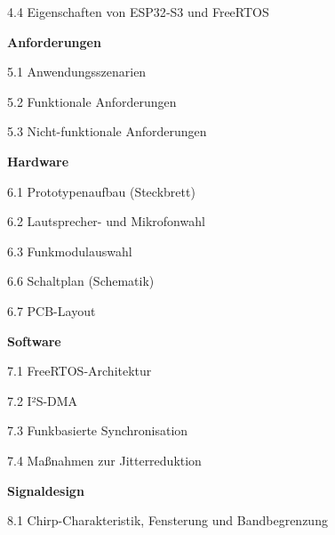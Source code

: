 \documentclass[a4paper,12pt,headsepline]{scrartcl}
\begin{document}
\noindent
\hspace{1cm} 4.4 Eigenschaften von ESP32‑S3 und FreeRTOS 

\vspace{0.5cm}
\noindent
\textbf{Anforderungen} 

\noindent
\hspace{1cm} 5.1 Anwendungsszenarien 

\noindent
\hspace{1cm} 5.2 Funktionale Anforderungen  

\noindent
\hspace{1cm} 5.3 Nicht-funktionale Anforderungen  

\vspace{0.5cm}
\noindent
\textbf{Hardware} 

\noindent
\hspace{1cm} 6.1 Prototypenaufbau (Steckbrett) 

\noindent
\hspace{1cm} 6.2 Lautsprecher- und Mikrofonwahl 

\noindent
\hspace{1cm} 6.3 Funkmodulauswahl 


\noindent
\hspace{1cm} 6.6 Schaltplan (Schematik) 

\noindent
\hspace{1cm} 6.7 PCB-Layout 

\vspace{0.5cm}
\noindent
\textbf{Software} 

\noindent
\hspace{1cm} 7.1 FreeRTOS-Architektur  

\noindent
\hspace{1cm} 7.2 I²S-DMA 

\noindent
\hspace{1cm} 7.3 Funkbasierte Synchronisation 

\noindent
\hspace{1cm} 7.4 Maßnahmen zur Jitterreduktion 

\vspace{0.5cm}
\noindent
\textbf{Signaldesign} 

\noindent
\hspace{1cm} 8.1 Chirp-Charakteristik, Fensterung und Bandbegrenzung 
\end{document}
